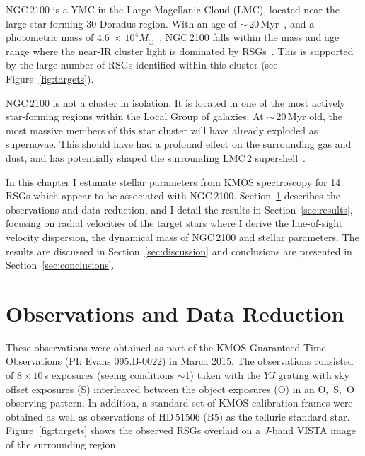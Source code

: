 NGC\,2100 is a YMC in the Large Magellanic Cloud (LMC), located near the large star-forming 30 Doradus region.
With an age of $\sim$\,20\,Myr~\citep{1991ApJS...76..185E,2015A&A...575A..62N}, and a photometric mass of $4.6~\times~10^4M_{\odot}$~\citep[assuming~\cite{1966AJ.....71...64K} profiles]{2005ApJS..161..304M}, NGC\,2100 falls within the mass and age range where the near-IR cluster light is dominated by RSGs~\citep{2013MNRAS.430L..35G}.
This is supported by the large number of RSGs identified within this cluster (see Figure~\ref{fig:targets}).

NGC\,2100 is not a cluster in isolation.
It is located in one of the most actively star-forming regions within the Local Group of galaxies.
At $\sim$\,20\,Myr old, the most massive members of this star cluster will have already exploded as supernovae.
This should have had a profound effect on the surrounding gas and dust, and has potentially shaped the surrounding LMC\,2 supershell~\citep[see][]{1999ApJ...518..298P}.

In this chapter I estimate stellar parameters from KMOS spectroscopy for 14 RSGs which appear to be associated with NGC\,2100.
Section~\ref{sec:observations} describes the observations and data reduction, and I detail the results in Section~\ref{sec:results}, focusing on radial velocities of the target stars where I derive the line-of-sight velocity dispersion,
the dynamical mass of NGC\,2100 and stellar parameters.
The results are discussed in Section~\ref{sec:discussion} and conclusions are presented in Section~\ref{sec:conclusions}.


\section{Observations and Data Reduction} %
\label{sec:observations}
These observations were obtained as part of the KMOS Guaranteed Time Observations (PI: Evans 095.B-0022) in March 2015.
The observations consisted of $8\times10$\,s exposures (seeing conditions $\sim$1) taken with the $YJ$ grating with sky offset exposures (S) interleaved between the object exposures (O) in an O,~S,~O observing pattern.
In addition, a standard set of KMOS calibration frames were obtained as well as observations of HD\,51506 (B5) as the telluric standard star.
Figure~\ref{fig:targets} shows the observed RSGs overlaid on a {\it J}-band VISTA image of the surrounding region~\citep{2011A&A...527A.116C}.

